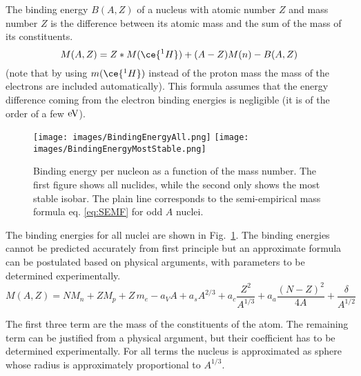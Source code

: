 \documentclass[12pt]{article}
\begin{document}
The binding energy $B(A,Z)$ of a nucleus with atomic number $Z$ and mass number $Z$ is the difference between its atomic mass and the sum of the mass of its constituents. 
\[M(A,Z)=Z*M(\ce{^{1}H})+(A-Z)M(n)-B(A,Z)\]
(note that by using $m(\ce{^{1}H})$ instead of the proton mass the mass of the electrons are included automatically). This formula assumes that the energy difference coming from the electron binding energies is negligible (it is of the order of a few $\rm{eV}$). 

\begin{figure}
\texttt{[image: images/BindingEnergyAll.png]}
\texttt{[image: images/BindingEnergyMostStable.png]}
\caption{Binding energy per nucleon as a function of the mass number. The first figure shows all nuclides, while the second only shows the most stable isobar. The plain line corresponds to the semi-empirical mass formula eq. \ref{eq:SEMF} for odd $A$ nuclei.}\label{fig:bindingEnergies}
\end{figure}


The binding energies for all nuclei are shown in Fig.~\ref{fig:bindingEnergies}. The binding energies cannot be predicted accurately from first principle but an approximate formula can be postulated based on physical arguments, with parameters to be determined experimentally. 
\begin{equation}\label{eq:SEMF}
M(A,Z)=N M_n+Z M_p+Z\, m_e-a_V A + a_sA^{2/3}+a_c\frac{Z^2}{A^{1/3}}+a_a\frac{(N-Z)^2}{4A}+\frac{\delta}{A^{1/2}}
\end{equation}  


The first three term are the mass of the constituents of the atom. The remaining term can be justified from a physical argument, but their coefficient has to be determined experimentally. For all terms the nucleus is approximated as sphere whose radius is approximately proportional to $A^{1/3}$.
\end{document}
